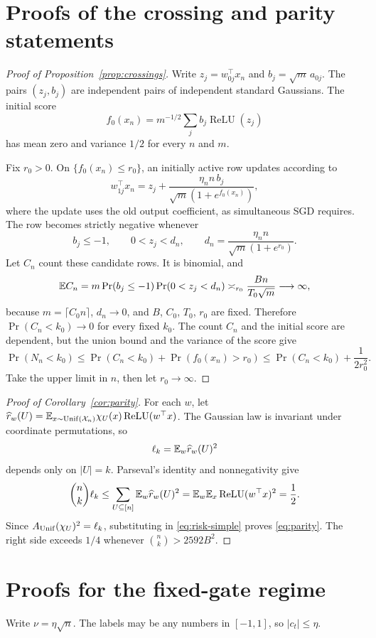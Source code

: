 \documentclass[11pt,letterpaper,pmlr,twoside]{jmlr}
\newcommand{\X}{\mathcal X}\newcommand{\Hc}{\mathcal H}
\newcommand{\relu}{\operatorname{ReLU}}\newcommand{\dc}{\operatorname{dc}}
\begin{document}
\section{Proofs of the crossing and parity statements}
\label{app:consequences}
\begin{proof}[Proof of Proposition~\ref{prop:crossings}]
Write $z_j=w_{0j}^\top x_n$ and $b_j=\sqrt m\,a_{0j}$. The pairs $(z_j,b_j)$ are independent pairs of independent standard Gaussians. The initial score
\[
 f_0(x_n)=m^{-1/2}\sum_j b_j\relu(z_j)
\]
has mean zero and variance $1/2$ for every $n$ and $m$.

Fix $r_0>0$. On $\{f_0(x_n)\le r_0\}$, an initially active row updates according to
\[
 w_{1j}^\top x_n=z_j+\frac{\eta_n n\,b_j}{\sqrt m(1+e^{f_0(x_n)})},
\]
where the update uses the old output coefficient, as simultaneous SGD requires. The row becomes strictly negative whenever
\[
 b_j\le-1,\qquad 0<z_j<d_n,
 \qquad d_n=\frac{\eta_n n}{\sqrt m(1+e^{r_0})}.
\]
Let $C_n$ count these candidate rows. It is binomial, and
\[
 \mathbb E C_n=m\Pr(b_j\le-1)\Pr(0<z_j<d_n)
 \asymp_{r_0}\frac{B n}{T_0\sqrt m}\longrightarrow\infty,
\]
because $m=\lceil C_0n\rceil$, $d_n\to0$, and $B$, $C_0$, $T_0$, $r_0$ are fixed. Therefore $\Pr(C_n<k_0)\to0$ for every fixed $k_0$. The count $C_n$ and the initial score are dependent, but the union bound and the variance of the score give
\[
 \Pr(N_n<k_0)\le\Pr(C_n<k_0)+\Pr(f_0(x_n)>r_0)
 \le\Pr(C_n<k_0)+\frac1{2r_0^2}.
\]
Take the upper limit in $n$, then let $r_0\to\infty$.
\end{proof}

\begin{proof}[Proof of Corollary~\ref{cor:parity}]
For each $w$, let $\widehat r_w(U)=\E_{x\sim\Unif(\X_n)}\chi_U(x)\relu(w^\top x)$. The Gaussian law is invariant under coordinate permutations, so
\[
 \ell_k=\mathbb E_w\widehat r_w(U)^2
\]
depends only on $|U|=k$. Parseval's identity and nonnegativity give
\[
 \binom nk\ell_k
 \le\sum_{U\subseteq[n]}\E_w\widehat r_w(U)^2
 =\E_w\E_x\relu(w^\top x)^2=\frac12.
\]
Since $A_{\operatorname{Unif}}(\chi_U)^2=\ell_k$, substituting in \eqref{eq:risk-simple} proves \eqref{eq:parity}. The right side exceeds $1/4$ whenever $\binom nk>2592B^2$.
\end{proof}

\section{Proofs for the fixed-gate regime}
\label{app:gate}
Write $\nu=\eta\sqrt n$. The labels may be any numbers in $[-1,1]$, so $|c_t|\le\eta$.
\end{document}
